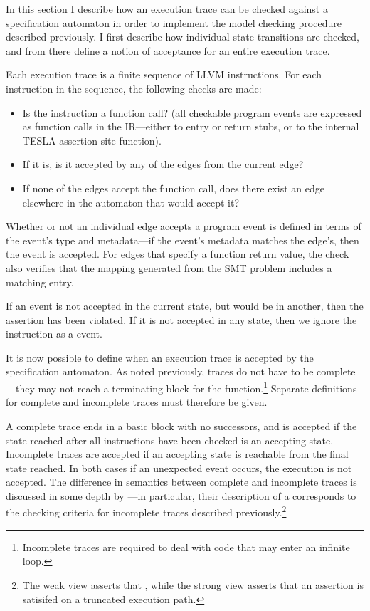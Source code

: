 In this section I describe how an execution trace can be checked against a
specification automaton in order to implement the model checking procedure
described previously. I first describe how individual state transitions are
checked, and from there define a notion of acceptance for an entire execution
trace.

Each execution trace is a finite sequence of LLVM instructions. For each
instruction in the sequence, the following checks are made:
\begin{itemize}
  \item Is the instruction a function call? (all checkable program events are
    expressed as function calls in the IR---either to entry or return stubs, or
    to the internal TESLA assertion site function).
  \item If it is, is it accepted by any of the edges from the current edge?
  \item If none of the edges accept the function call, does there exist an edge
    elsewhere in the automaton that would accept it?
\end{itemize}

Whether or not an individual edge accepts a program event is defined in terms of
the event's type and metadata---if the event's metadata matches the edge's, then
the event is accepted. For edges that specify a function return value, the check
also verifies that the mapping generated from the SMT problem includes a
matching entry.

If an event is not accepted in the current state, but would be in another, then
the assertion has been violated. If it is not accepted in any state, then we
ignore the instruction as a  event.

It is now possible to define when an execution trace is accepted by the
specification automaton. As noted previously, traces do not have to be
complete---they may not reach a terminating block for the
function.\footnote{Incomplete traces are required to deal with code that may
enter an infinite loop.} Separate definitions for complete and incomplete traces
must therefore be given.

A complete trace ends in a basic block with no successors, and is accepted if
the state reached after all instructions have been checked is an accepting
state. Incomplete traces are accepted if an accepting state is reachable from
the final state reached. In both cases if an unexpected event occurs, the
execution is not accepted. The difference in semantics between complete and
incomplete traces is discussed in some depth by
\textcite{eisner_reasoning_2003}---in particular, their description of a
 corresponds to the checking criteria for incomplete traces
described previously.\footnote{The weak view asserts that
, while the
strong view asserts that an assertion is  satisifed on a
truncated execution path.}

